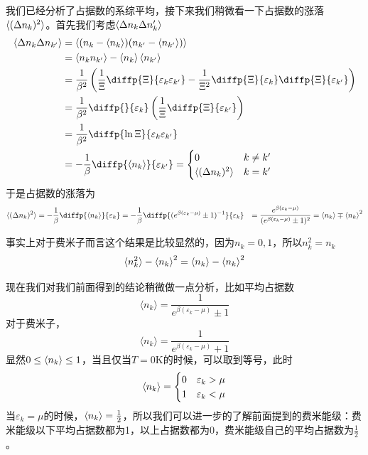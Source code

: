 我们已经分析了占据数的系综平均，接下来我们稍微看一下占据数的涨落$\braket{(\Delta n_k)^2}$。首先我们考虑$\braket{\Delta n_k \Delta n_k'}$\begin{equation}
    \begin{aligned}
        \braket{\Delta n_k \Delta n_{k'}} & =\braket{(n_k-\braket{n_k})(n_{k'}-\braket{n_{k'}})} \\
        & =\braket{n_k n_{k'}}-\braket{n_k}\braket{n_{k'}}  \\
        & = \frac{1}{\beta^2}\left( \frac{1}{\Xi}\diffp{\Xi}{{\varepsilon_k }{\varepsilon_{k'}}} -\frac{1}{\Xi^2} \diffp{\Xi}{{\varepsilon_k}}\diffp{\Xi}{{\varepsilon_{k'}}}\right)\\
        & = \frac{1}{\beta^2}\diffp{}{{\varepsilon_k}}\left(\frac{1}{\Xi} \diffp{\Xi}{{\varepsilon_{k'}}}\right)\\
        & = \frac{1}{\beta^2}\diffp{\ln \Xi}{{\varepsilon_k }{\varepsilon_{k'}}}\\
        & = -\frac{1}{\beta}\diffp{{\braket{n_k}}}{{\varepsilon_{k'}}}
        =\begin{cases}
            0 & k\neq k' \\
            \braket{(\Delta n_k)^2} & k=k'
        \end{cases}
    \end{aligned}
\end{equation}
于是占据数的涨落为\begin{equation}
\begin{aligned}
    \braket{(\Delta n_k)^2}& =-\frac{1}{\beta}\diffp{{\braket{n_k}}}{{\varepsilon_{k}}} =-\frac{1}{\beta}\diffp{{(e^{\beta (\varepsilon_k-\mu)}\pm 1)^{-1}}}{{\varepsilon_{k}}} 
    & = \frac{e^{\beta (\varepsilon_k-\mu)}}{( e^{\beta (\varepsilon_k-\mu)}\pm 1)^{2}}=\braket{n_k}\mp \braket{n_k}^2
\end{aligned}\end{equation}

事实上对于费米子而言这个结果是比较显然的，因为$n_k=0,1$，所以$n_k^2=n_k$\begin{equation}
    \braket{n_k^2}-\braket{n_k}^2=\braket{n_k}-\braket{n_k}^2
\end{equation}

现在我们对我们前面得到的结论稍微做一点分析，比如平均占据数\begin{equation}
    \langle n_k\rangle =\frac{1}{e^{\beta(\varepsilon_k-\mu)}\pm 1}
\end{equation}
对于费米子，\begin{equation}
    \langle n_k\rangle =\frac{1}{e^{\beta(\varepsilon_k-\mu)}+1}
\end{equation}
显然$0\le \braket{n_k}\le 1$，当且仅当$T=0$K的时候，可以取到等号，此时\begin{equation}
    \braket{n_k}=\begin{cases}
        0 & \varepsilon_k>\mu \\
        1 & \varepsilon_k<\mu
    \end{cases}
\end{equation}
当$\varepsilon_k=\mu$的时候，$\braket{n_k}=\frac{1}{2}$，所以我们可以进一步的了解前面提到的费米能级：费米能级以下平均占据数都为1，以上占据数都为0，费米能级自己的平均占据数为$\frac{1}{2}$。

